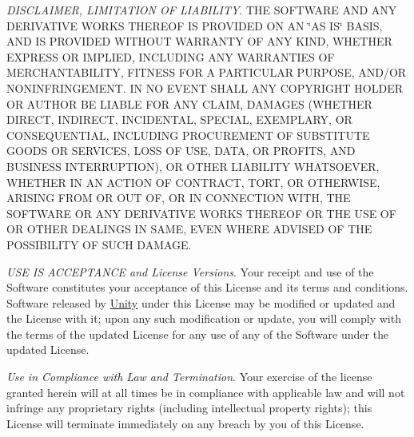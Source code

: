 \begin{DoxyEnumerate}
\item {\itshape D\+I\+S\+C\+L\+A\+I\+M\+ER, L\+I\+M\+I\+T\+A\+T\+I\+ON OF L\+I\+A\+B\+I\+L\+I\+TY}. T\+HE S\+O\+F\+T\+W\+A\+RE A\+ND A\+NY D\+E\+R\+I\+V\+A\+T\+I\+VE W\+O\+R\+KS T\+H\+E\+R\+E\+OF IS P\+R\+O\+V\+I\+D\+ED ON AN \char`\"{}\+A\+S I\+S\char`\"{} B\+A\+S\+IS, A\+ND IS P\+R\+O\+V\+I\+D\+ED W\+I\+T\+H\+O\+UT W\+A\+R\+R\+A\+N\+TY OF A\+NY K\+I\+ND, W\+H\+E\+T\+H\+ER E\+X\+P\+R\+E\+SS OR I\+M\+P\+L\+I\+ED, I\+N\+C\+L\+U\+D\+I\+NG A\+NY W\+A\+R\+R\+A\+N\+T\+I\+ES OF M\+E\+R\+C\+H\+A\+N\+T\+A\+B\+I\+L\+I\+TY, F\+I\+T\+N\+E\+SS F\+OR A P\+A\+R\+T\+I\+C\+U\+L\+AR P\+U\+R\+P\+O\+SE, A\+N\+D/\+OR N\+O\+N\+I\+N\+F\+R\+I\+N\+G\+E\+M\+E\+NT. IN NO E\+V\+E\+NT S\+H\+A\+LL A\+NY C\+O\+P\+Y\+R\+I\+G\+HT H\+O\+L\+D\+ER OR A\+U\+T\+H\+OR BE L\+I\+A\+B\+LE F\+OR A\+NY C\+L\+A\+IM, D\+A\+M\+A\+G\+ES (W\+H\+E\+T\+H\+ER D\+I\+R\+E\+CT, I\+N\+D\+I\+R\+E\+CT, I\+N\+C\+I\+D\+E\+N\+T\+AL, S\+P\+E\+C\+I\+AL, E\+X\+E\+M\+P\+L\+A\+RY, OR C\+O\+N\+S\+E\+Q\+U\+E\+N\+T\+I\+AL, I\+N\+C\+L\+U\+D\+I\+NG P\+R\+O\+C\+U\+R\+E\+M\+E\+NT OF S\+U\+B\+S\+T\+I\+T\+U\+TE G\+O\+O\+DS OR S\+E\+R\+V\+I\+C\+ES, L\+O\+SS OF U\+SE, D\+A\+TA, OR P\+R\+O\+F\+I\+TS, A\+ND B\+U\+S\+I\+N\+E\+SS I\+N\+T\+E\+R\+R\+U\+P\+T\+I\+ON), OR O\+T\+H\+ER L\+I\+A\+B\+I\+L\+I\+TY W\+H\+A\+T\+S\+O\+E\+V\+ER, W\+H\+E\+T\+H\+ER IN AN A\+C\+T\+I\+ON OF C\+O\+N\+T\+R\+A\+CT, T\+O\+RT, OR O\+T\+H\+E\+R\+W\+I\+SE, A\+R\+I\+S\+I\+NG F\+R\+OM OR O\+UT OF, OR IN C\+O\+N\+N\+E\+C\+T\+I\+ON W\+I\+TH, T\+HE S\+O\+F\+T\+W\+A\+RE OR A\+NY D\+E\+R\+I\+V\+A\+T\+I\+VE W\+O\+R\+KS T\+H\+E\+R\+E\+OF OR T\+HE U\+SE OF OR O\+T\+H\+ER D\+E\+A\+L\+I\+N\+GS IN S\+A\+ME, E\+V\+EN W\+H\+E\+RE A\+D\+V\+I\+S\+ED OF T\+HE P\+O\+S\+S\+I\+B\+I\+L\+I\+TY OF S\+U\+CH D\+A\+M\+A\+GE.
\end{DoxyEnumerate}
\begin{DoxyEnumerate}
\item {\itshape U\+SE IS A\+C\+C\+E\+P\+T\+A\+N\+CE and License Versions}. Your receipt and use of the Software constitutes your acceptance of this License and its terms and conditions. Software released by \mbox{\hyperlink{namespace_unity}{Unity}} under this License may be modified or updated and the License with it; upon any such modification or update, you will comply with the terms of the updated License for any use of any of the Software under the updated License.
\end{DoxyEnumerate}
\begin{DoxyEnumerate}
\item {\itshape Use in Compliance with Law and Termination}. Your exercise of the license granted herein will at all times be in compliance with applicable law and will not infringe any proprietary rights (including intellectual property rights); this License will terminate immediately on any breach by you of this License.
\end{DoxyEnumerate}
